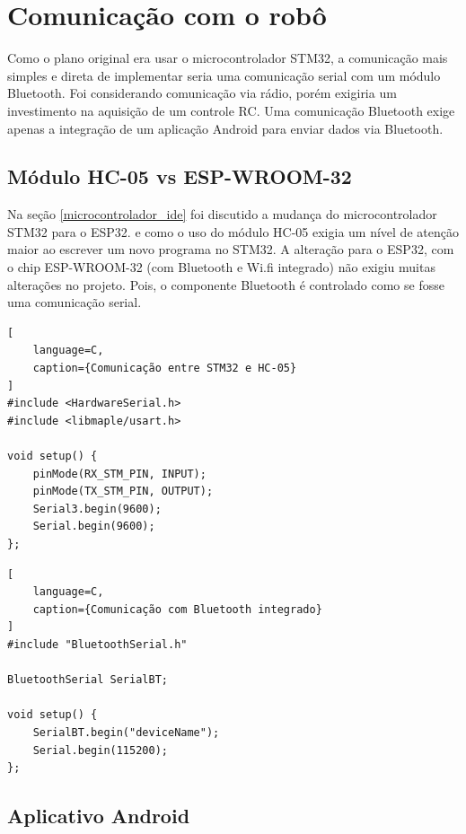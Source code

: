 
\section{Comunicação com o robô}

Como o plano original era usar o microcontrolador STM32,
a comunicação mais simples e direta de implementar seria uma comunicação serial com um módulo Bluetooth.
Foi considerando comunicação via rádio, porém exigiria um investimento na aquisição de um controle RC.
Uma comunicação Bluetooth exige apenas a integração de um aplicação Android para enviar dados via Bluetooth.

\subsection{Módulo HC-05 vs ESP-WROOM-32}

Na seção \ref{microcontrolador_ide} foi discutido a mudança do microcontrolador STM32 para o ESP32.
e como o uso do módulo HC-05 exigia um nível de atenção maior ao escrever um novo programa no STM32.
A alteração para o ESP32, com o chip ESP-WROOM-32 (com Bluetooth e Wi.fi integrado) não exigiu muitas alterações no projeto.
Pois, o componente Bluetooth é controlado como se fosse uma comunicação serial.

\noindent
\begin{minipage}[t]{0.48\textwidth}
\captionsetup{labelformat=empty}
\begin{lstlisting}[
    language=C,
    caption={Comunicação entre STM32 e HC-05}
]
#include <HardwareSerial.h>
#include <libmaple/usart.h>

void setup() {
    pinMode(RX_STM_PIN, INPUT);
    pinMode(TX_STM_PIN, OUTPUT);
    Serial3.begin(9600);
    Serial.begin(9600);
};
\end{lstlisting}
\end{minipage}
\hfill
\begin{minipage}[t]{0.48\textwidth}
\captionsetup{labelformat=empty}
\begin{lstlisting}[
    language=C,
    caption={Comunicação com Bluetooth integrado}
]
#include "BluetoothSerial.h"

BluetoothSerial SerialBT;

void setup() {
    SerialBT.begin("deviceName");
    Serial.begin(115200);
};
\end{lstlisting}
\end{minipage}

\subsection{Aplicativo Android}

